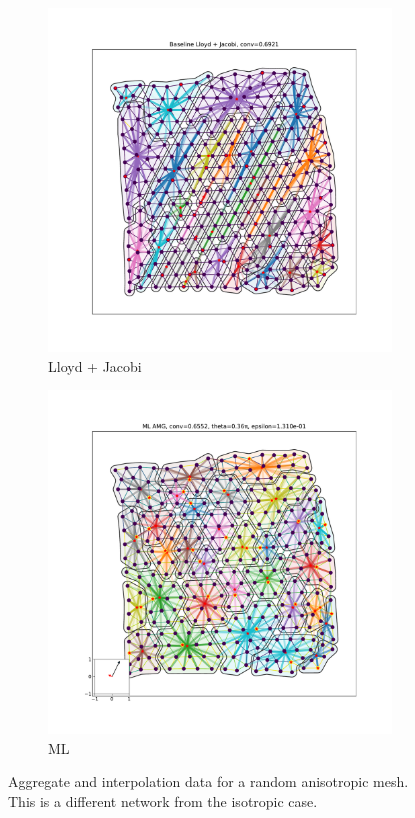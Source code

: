 \documentclass{article}
\begin{document}
\begin{figure}[h]
\begin{subfigure}[t]{0.32\textwidth}
    \includegraphics[width=\textwidth, trim=80 70 70 50, clip]{grid_anis_4_lloyd.pdf}
    \caption{Lloyd + Jacobi}
  \end{subfigure}
  \begin{subfigure}[t]{0.32\textwidth}
    \centering
    \includegraphics[width=\textwidth, trim=80 70 70 50, clip]{grid_anis_4_ml.pdf}
    \caption{ML}
  \end{subfigure}
  \caption{Aggregate and interpolation data for a random anisotropic mesh.  This is a different network from the isotropic case.}
  \label{fig:grid_anis_4}
\end{figure}
\end{document}
